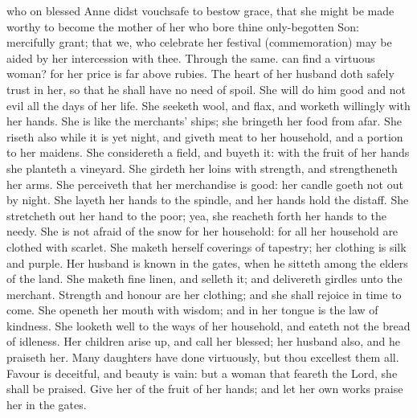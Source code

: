 \collect
{} who on blessed Anne didst vouchsafe to bestow grace, that she might be made worthy to become the mother of her who bore thine only-begotten Son: mercifully grant; that we, who celebrate her festival (commemoration) may be aided by her intercession with thee. Through the same.
 can find a virtuous woman? for her price is far above rubies. The heart of her husband doth safely trust in her, so that he shall have no need of spoil. She will do him good and not evil all the days of her life. She seeketh wool, and flax, and worketh willingly with her hands. She is like the merchants’ ships; she bringeth her food from afar. She riseth also while it is yet night, and giveth meat to her household, and a portion to her maidens. She considereth a field, and buyeth it: with the fruit of her hands she planteth a vineyard. She girdeth her loins with strength, and strengtheneth her arms. She perceiveth that her merchandise is good: her candle goeth not out by night. She layeth her hands to the spindle, and her hands hold the distaff. She stretcheth out her hand to the poor; yea, she reacheth forth her hands to the needy. She is not afraid of the snow for her household: for all her household are clothed with scarlet. She maketh herself coverings of tapestry; her clothing is silk and purple. Her husband is known in the gates, when he sitteth among the elders of the land. She maketh fine linen, and selleth it; and delivereth girdles unto the merchant. Strength and honour are her clothing; and she shall rejoice in time to come. She openeth her mouth with wisdom; and in her tongue is the law of kindness. She looketh well to the ways of her household, and eateth not the bread of idleness. Her children arise up, and call her blessed; her husband also, and he praiseth her. Many daughters have done virtuously, but thou excellest them all. Favour is deceitful, and beauty is vain: but a woman that feareth the Lord, she shall be praised. Give her of the fruit of her hands; and let her own works praise her in the gates.
